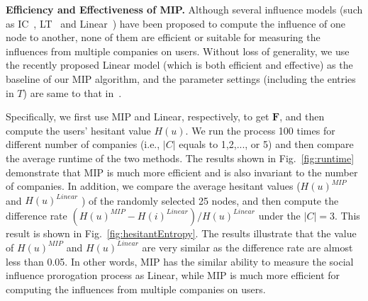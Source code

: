 \documentclass{llncs}
\begin{document}
\textbf{Efficiency and Effectiveness of MIP. } Although several influence models (such as IC~\cite{kempe2003maximizing}, LT~\cite{granovetter1978threshold} and Linear~\cite{ijcai13biaoxiang}) have been proposed to compute the influence of one node to another, none of them are efficient or suitable for measuring the influences from multiple companies on users. Without loss of generality, we use the recently proposed Linear model (which is both efficient and effective) as the baseline of our MIP algorithm, and the parameter settings (including the entries in $T$) are same to that in~\cite{ijcai13biaoxiang}.

Specifically, we first use MIP and Linear, respectively, to get $\mathbf{F}$, and then compute the users' hesitant value $H(u)$. We run the process 100 times for different number of companies (i.e., $|C|$ equals to 1,2,..., or 5) and then compare the average runtime of the two methods. The results shown in Fig.~\ref{fig:runtime} demonstrate that MIP is much more efficient and is also invariant to the number of companies. In addition, we compare the average hesitant values ($H(u)^{MIP}$ and $H(u)^{Linear}$ ) of the randomly selected 25 nodes, and then compute the difference rate $({H(u)^{MIP}- H(i)^{Linear}} )/ { H(u)^{Linear} }$ under the $|C|=3$. This result is shown in Fig.~\ref{fig:hesitantEntropy}. The results illustrate that the value of $H(u)^{MIP}$ and $H(u)^{Linear}$ are very similar as the difference rate are almost less than 0.05. In other words, MIP has the similar ability to measure the social influence prorogation process as Linear, while MIP is much more efficient for computing the influences from multiple companies on users.
\end{document}
